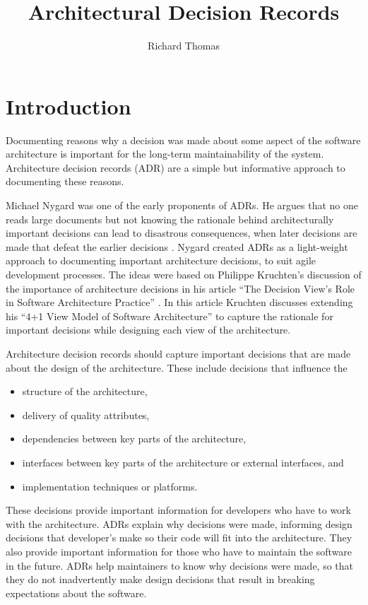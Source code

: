 \title{Architectural Decision Records}
\author{Richard Thomas}

\maketitle

\section{Introduction}

Documenting reasons why a decision was made about some aspect of the software architecture is important for the long-term maintainability of the system.
Architecture decision records (ADR) are a simple but informative approach to documenting these reasons.

Michael Nygard was one of the early proponents of ADRs.
He argues that no one reads large documents but not knowing the rationale behind architecturally important decisions
can lead to disastrous consequences, when later decisions are made that defeat the earlier decisions \cite{nygard-adr}.
Nygard created ADRs as a light-weight approach to documenting important architecture decisions, to suit agile development processes.
The ideas were based on Philippe Kruchten's discussion of the importance of architecture decisions in his article
``The Decision View's Role in Software Architecture Practice'' \cite{kruchten-arch-decisions}.
In this article Kruchten discusses extending his ``4+1 View Model of Software Architecture'' \cite{4+1-model}
to capture the rationale for important decisions while designing each view of the architecture.

Architecture decision records should capture important decisions that are made about the design of the architecture.
These include decisions that influence the 
\begin{itemize}[topsep=0pt,noitemsep]
    \item structure of the architecture,
    \item delivery of quality attributes,
    \item dependencies between key parts of the architecture,
    \item interfaces between key parts of the architecture or external interfaces, and
    \item implementation techniques or platforms.
\end{itemize}
These decisions provide important information for developers who have to work with the architecture.
ADRs explain why decisions were made, informing design decisions that developer's make so their code will fit into the architecture.
They also provide important information for those who have to maintain the software in the future.
ADRs help maintainers to know why decisions were made,
so that they do not inadvertently make design decisions that result in breaking expectations about the software.

